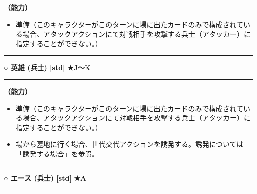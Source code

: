 \documentclass[twocolumn,a5paper,papersize,10pt]{jarticle}
\begin{document}
{\bf（能力）}


\vspace{-1zh}%
\begin{itemize}
\setlength{\leftskip}{-0.3cm}
\setlength{\parskip}{0pt} %

\item 準備（このキャラクターがこのターンに場に出たカードのみで構成されている場合、アタックアクションにて対戦相手を攻撃する兵士（アタッカー）に指定することができない。）
\vspace{-1zh}%
\end{itemize}
\vspace{2mm} %
\hrule height 0.5mm depth 0mm width 66.5mm %
\vspace{1mm} %
{\small\bf ○ 英雄 {\scriptsize (兵士) [std]}} %
\hfill 
{\footnotesize\bf ★J〜K }

\vspace{1mm}%
\hrule height 0.1mm depth 0mm width 66.5mm %
\vspace{1mm}%

{\bf（能力）}


\vspace{-1zh}%
\begin{itemize}
\setlength{\leftskip}{-0.3cm}
\setlength{\parskip}{0pt} %

\item 準備（このキャラクターがこのターンに場に出たカードのみで構成されている場合、アタックアクションにて対戦相手を攻撃する兵士（アタッカー）に指定することができない。）

\item 場から墓地に行く場合、世代交代アクションを誘発する。誘発については「誘発する場合」を参照。
\vspace{-1zh}%
\end{itemize}
\vspace{2mm} %
\hrule height 0.5mm depth 0mm width 66.5mm %
\vspace{1mm} %
{\small\bf ○ エース {\scriptsize (兵士) [std]}} %
\hfill 
{\footnotesize\bf ★A }

\vspace{1mm}%
\hrule height 0.1mm depth 0mm width 66.5mm %
\vspace{1mm}%
\end{document}
